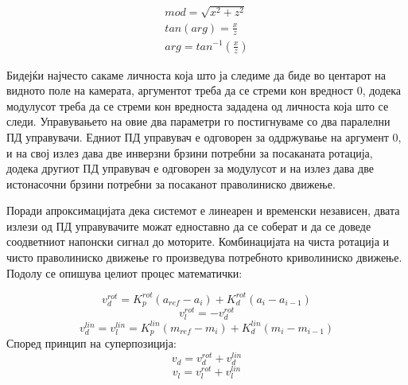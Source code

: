 \documentclass[12pt]{article}
\begin{document}

      \begin{equation} \label{eq:cart2pol}
        \begin{aligned}
    	  mod = \sqrt{x^{2} + z^{2}} \\
        tan(arg) = \frac{x}{z} \\
        arg = tan^{-1}(\frac{x}{z})
        \end{aligned}
        \end{equation}

      Бидејќи најчесто сакаме личноста која што ја следиме да биде во центарот на видното поле на камерата, аргументот треба да се стреми кон вредност 0, додека модулусот треба да се стреми кон вредноста зададена од личноста која што се следи. Управувањето на овие два параметри го постигнуваме со два паралелни ПД управувачи. Едниот ПД управувач е одговорен за оддржување на аргумент 0, и на свој излез дава две инверзни брзини потребни за посаканата ротација, додека другиот ПД управувач е одговорен за модулусот и на излез дава две истонасочни брзини потребни за посаканот праволиниско движење.


      Поради апроксимацијата дека системот е линеарен и временски независен, двата излези од ПД управувачите можат едноставно да се соберат и да се доведе соодветниот напонски сигнал до моторите. Комбинацијата на чиста ротација и чисто праволиниско движење го произведува потребното криволиниско движење. Подолу се опишува целиот процес математички:

      $$      v_d^{rot} = K_p^{rot}(a_{ref} - a_i) + K_d^{rot}(a_i - a_{i-1}) $$
      $$      v_l^{rot} = -v_d^{rot}  $$
      $$      v_d^{lin} = v_l^{lin} = K_p^{lin}(m_{ref} - m_i) + K_d^{lin}(m_i - m_{i-1}) $$
      Според принцип на суперпозиција:
      $$      v_d = v_d^{rot} + v_d^{lin} $$
      $$      v_l = v_l^{rot} + v_l^{lin} $$
\end{document}
